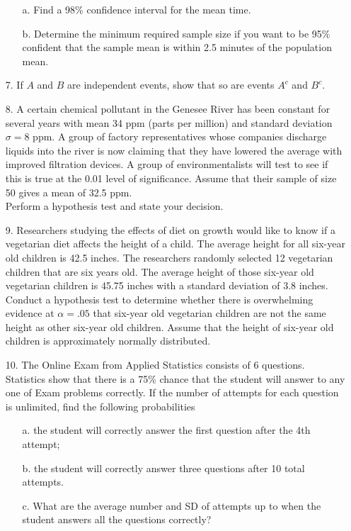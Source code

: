 \documentclass[letterpaper,12pt]{article}
\begin{document}
\begin{enumerate}
    \begin{enumerate}
      \item[a.]
        Find a 98\% confidence interval for the mean time.
      \item[b.]
        Determine the minimum required sample size if you want to be 95\% confident that the sample mean is within 2.5 minutes of the population mean.
    \end{enumerate}
  \item[7.]
    If $A$ and $B$ are independent events, show that so are events $A^c$ and $B^c$.
  \item[8.]
    A certain chemical pollutant in the Genesee River has been constant for several years with mean 34 ppm (parts per million) and standard deviation $\sigma = 8$ ppm. A group of factory representatives whose companies discharge liquids into the river is now claiming that they have lowered the average with improved filtration devices. A group of environmentalists will test to see if this is true at the 0.01 level of significance. Assume that their sample of size 50 gives a mean of 32.5 ppm. \\
    Perform a hypothesis test and state your decision.
  \item[9.]
    Researchers studying the effects of diet on growth would like to know if a vegetarian diet affects the height of a child. The average height for all six-year old children is 42.5 inches. The researchers randomly selected 12 vegetarian children that are six years old. The average height of those six-year old vegetarian children is 45.75 inches with a standard deviation of 3.8 inches. Conduct a hypothesis test to determine whether there is overwhelming evidence at $\alpha = .05$ that six-year old vegetarian children are not the same height as other six-year old children. Assume that the height of six-year old children is approximately normally distributed.
  \item[10.]
    The Online Exam from Applied Statistics consists of 6 questions. Statistics show that there is a 75\% chance that the student will answer to any one of Exam problems correctly. If the number of attempts for each question is unlimited, find the following probabilities
    \begin{enumerate}
      \item[a.]
        the student will correctly answer the first question after the 4th attempt;
      \item[b.]
        the student will correctly answer three questions after 10 total attempts.
      \item[c.]
        What are the average number and SD of attempts up to when the student answers all the questions correctly?
    \end{enumerate}
\end{enumerate}
\end{document}

